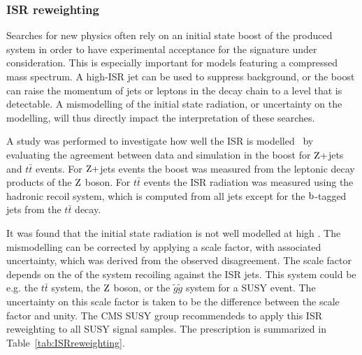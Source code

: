
% 
% 
% 


\subsubsection{ISR reweighting \label{sec:event_ISRreweighting}}

Searches for new physics often rely on an initial state boost of the produced system in order to
have experimental acceptance for the signature under consideration. This is especially important
for models featuring a compressed mass spectrum. A high-\pt ISR jet can be used to suppress
background, or the boost can raise the momentum of jets or leptons in the decay chain to a level
that is detectable.
A mismodelling of the initial state radiation, or uncertainty on the modelling, will thus
directly impact the interpretation of these searches. 

A study was performed to investigate how well the ISR is
modelled~\cite{Chatrchyan:2013xna,ISRreweighting} by evaluating the agreement between data and
simulation in the boost \pt for $\mathrm{Z}+$jets and $t\bar{t}$ events. 
For $\mathrm{Z}+$jets events the boost \pt was measured from the leptonic decay products of the $\mathrm{Z}$
boson. For $t\bar{t}$ events the ISR radiation was measured using the hadronic recoil system, which
is computed from all jets except for the $\mathrm{b}$-tagged jets from the $t\bar{t}$ decay. 

It was found that the initial state radiation is not well modelled at high \pt. The mismodelling
can be corrected by applying a scale factor, with associated uncertainty, which was derived from the
observed disagreement. The scale factor depends on the \pt of the system recoiling against the ISR
jets. This system could be e.g. the $t\bar{t}$ system, the $\mathrm{Z}$ boson, or the $\tilde{g}\tilde{g}$
system for a SUSY event.  The uncertainty on this scale factor is taken to be the difference
between the scale factor and unity. 
The CMS SUSY group recommendeds to apply this ISR reweighting to all SUSY signal samples.
The prescription is summarized in Table~\ref{tab:ISRreweighting}. 

